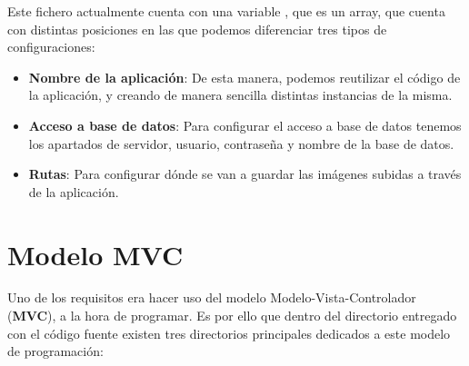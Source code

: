 \documentclass{\ClassPath/viu-tfm-template}
\begin{document}
Este fichero actualmente cuenta con una variable , que es un array, que cuenta con distintas posiciones en las que podemos diferenciar tres tipos de configuraciones:
\vspace{-1em}
\begin{itemize}
    \item \textbf{Nombre de la aplicación}: De esta manera, podemos reutilizar el código de la aplicación, y creando de manera sencilla distintas instancias de la misma.
    \item \textbf{Acceso a base de datos}: Para configurar el acceso a base de datos tenemos los apartados de servidor, usuario, contraseña y nombre de la base de datos.
    \item \textbf{Rutas}: Para configurar dónde se van a guardar las imágenes subidas a través de la aplicación.
\end{itemize}
\vspace{-1em}

\section{Modelo MVC}
Uno de los requisitos era hacer uso del modelo Modelo-Vista-Controlador (\textbf{MVC}), a la hora de programar. Es por ello que dentro del directorio entregado con el código fuente existen tres directorios principales dedicados a este modelo de programación:
\end{document}
